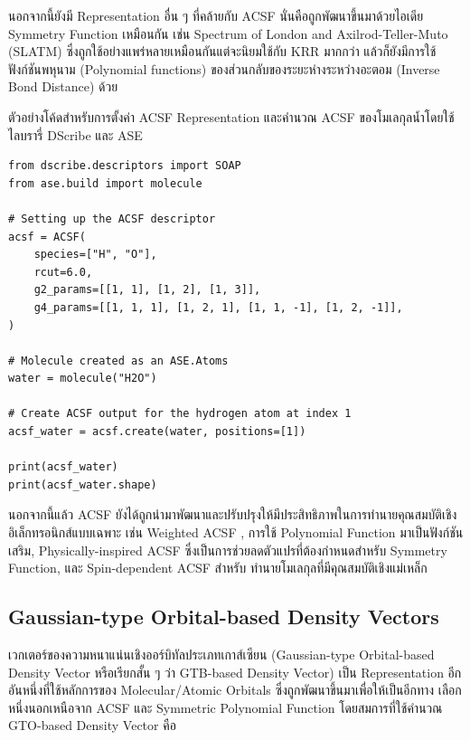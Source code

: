 นอกจากนี้ยังมี Representation อื่น ๆ ที่คล้ายกับ ACSF นั่นคือถูกพัฒนาขึ้นมาด้วยไอเดีย Symmetry Function เหมือนกัน เช่น 
Spectrum of London and Axilrod-Teller-Muto (SLATM) ซึ่งถูกใช้อย่างแพร่หลายเหมือนกันแต่จะนิยมใช้กับ KRR มากกว่า%
\autocite{faber2018,huang2020} แล้วก็ยังมีการใช้ฟังก์ชันพหุนาม (Polynomial functions) ของส่วนกลับของระยะห่างระหว่างอะตอม
(Inverse Bond Distance) ด้วย\autocite{kwac2019,musil2021}

ตัวอย่างโค้ดสำหรับการตั้งค่า ACSF Representation และคำนวณ ACSF ของโมเลกุลน้ำโดยใช้ไลบรารี่ DScribe และ ASE

\begin{lstlisting}[style=MyPython]
from dscribe.descriptors import SOAP
from ase.build import molecule

# Setting up the ACSF descriptor
acsf = ACSF(
    species=["H", "O"],
    rcut=6.0,
    g2_params=[[1, 1], [1, 2], [1, 3]],
    g4_params=[[1, 1, 1], [1, 2, 1], [1, 1, -1], [1, 2, -1]],
)

# Molecule created as an ASE.Atoms
water = molecule("H2O")

# Create ACSF output for the hydrogen atom at index 1
acsf_water = acsf.create(water, positions=[1])

print(acsf_water)
print(acsf_water.shape)
\end{lstlisting}

\vspace{1em}
นอกจากนี้แล้ว ACSF ยังได้ถูกนำมาพัฒนาและปรับปรุงให้มีประสิทธิภาพในการทำนายคุณสมบัติเชิงอิเล็กทรอนิกส์แบบเฉพาะ เช่น Weighted ACSF%
\autocite{gastegger2018}, การใช้ Polynomial Function มาเป็นฟังก์ชันเสริม\autocite{bircher2021}, Physically-inspired 
ACSF\autocite{zhang2021} ซึ่งเป็นการช่วยลดตัวแปรที่ต้องกำหนดสำหรับ Symmetry Function, และ Spin-dependent ACSF สำหรับ%
ทำนายโมเลกุลที่มีคุณสมบัติเชิงแม่เหล็ก\autocite{eckhoff2021}

\subsection{Gaussian-type Orbital-based Density Vectors}
\label{ssec:gauss_orb_den}

เวกเตอร์ของความหนาแน่นเชิงออร์บิทัลประเภทเกาส์เซียน (Gaussian-type Orbital-based Density Vector หรือเรียกสั้น ๆ ว่า GTB-based 
Density Vector) เป็น Representation อีกอันหนึ่งที่ใช้หลักการของ Molecular/Atomic Orbitals ซึ่งถูกพัฒนาขึ้นมาเพื่อให้เป็นอีกทาง%
เลือกหนึ่งนอกเหนือจาก ACSF และ Symmetric Polynomial Function\autocite{kwac2021} โดยสมการที่ใช้คำนวณ GTO-based Density 
Vector คือ

